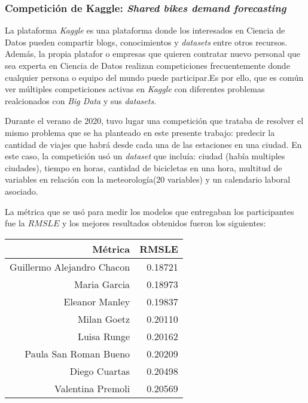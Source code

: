 \subsubsection{Competición de Kaggle: \textit{Shared bikes demand forecasting}} \label{kaggle_competition}

La plataforma \textit{Kaggle} es una plataforma donde los interesados en Ciencia de Datos pueden compartir blogs, conocimientos y \textit{datasets} entre otros recursos. Además, la propia platafor o empresas que quieren contratar nuevo personal que sea experta en Ciencia de Datos realizan competiciones frecuentemente donde cualquier persona o equipo del mundo puede participar.Es por ello, que es común ver múltiples competiciones activas en \textit{Kaggle} con diferentes problemas realcionados con \textit{Big Data } y sus \textit{datasets}.
\newline

Durante el verano de 2020, tuvo lugar una competición \cite{kaggleCompetition} que trataba de resolver el mismo problema que se ha planteado en este presente trabajo: predecir la cantidad de viajes que habrá desde cada una de las estaciones en una ciudad. En este caso, la competición usó un \textit{dataset} que incluía: ciudad (había multiples ciudades), tiempo en horas, cantidad de bicicletas en una hora, multitud de variables en relación con la meteorología(20 variables) y un calendario laboral asociado.
\newline

La métrica que se usó para medir los modelos que entregaban los participantes fue la $RMSLE$ y los mejores resultados obtenidos fueron los siguientes:

\begin{table}[H]
\centering
\begin{tabular}{rr}
\toprule
 Métrica & RMSLE \\
\midrule
 Guillermo Alejandro Chacon &  0.18721 \\
 Maria Garcia &  0.18973 \\
 Eleanor Manley &  0.19837 \\
 Milan Goetz &  0.20110 \\
 Luisa Runge &  0.20162 \\
 Paula San Roman Bueno &  0.20209 \\
 Diego Cuartas &  0.20498 \\
 Valentina Premoli & 0.20569 \\
\bottomrule
\end{tabular}
\end{table}